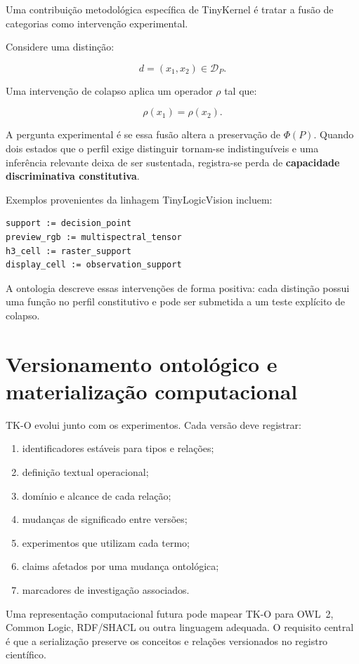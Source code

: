 \documentclass[11pt,a4paper]{article}
\begin{document}
Uma contribuição metodológica específica de TinyKernel é tratar a fusão de
categorias como intervenção experimental.

Considere uma distinção:

\[
d=(x_1,x_2)\in\mathcal D_P.
\]

Uma intervenção de colapso aplica um operador $\rho$ tal que:

\[
\rho(x_1)=\rho(x_2).
\]

A pergunta experimental é se essa fusão altera a preservação de $\Phi(P)$.
Quando dois estados que o perfil exige distinguir tornam-se indistinguíveis e uma
inferência relevante deixa de ser sustentada, registra-se perda de
\textbf{capacidade discriminativa constitutiva}.

Exemplos provenientes da linhagem TinyLogicVision incluem:

\begin{lstlisting}
support := decision_point
preview_rgb := multispectral_tensor
h3_cell := raster_support
display_cell := observation_support
\end{lstlisting}

A ontologia descreve essas intervenções de forma positiva: cada distinção possui uma
função no perfil constitutivo e pode ser submetida a um teste explícito de colapso.

\section{Versionamento ontológico e materialização computacional}

TK-O evolui junto com os experimentos. Cada versão deve registrar:

\begin{enumerate}
  \item identificadores estáveis para tipos e relações;
  \item definição textual operacional;
  \item domínio e alcance de cada relação;
  \item mudanças de significado entre versões;
  \item experimentos que utilizam cada termo;
  \item claims afetados por uma mudança ontológica;
  \item marcadores de investigação associados.
\end{enumerate}

Uma representação computacional futura pode mapear TK-O para OWL~2, Common Logic,
RDF/SHACL ou outra linguagem adequada. O requisito central é que a serialização
preserve os conceitos e relações versionados no registro científico.
\end{document}
